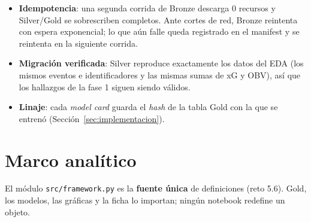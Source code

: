 \documentclass[11pt,a4paper]{article}
\begin{document}
\begin{itemize}
  \item \textbf{Idempotencia}: una segunda corrida de Bronze descarga 0 recursos y Silver/Gold se sobrescriben
        completos. Ante cortes de red, Bronze reintenta con espera exponencial; lo que aún falle queda registrado en el
        manifest y se reintenta en la siguiente corrida.
  \item \textbf{Migración verificada}: Silver reproduce exactamente los datos del EDA (los mismos \nEventos{} eventos e
        identificadores y las mismas sumas de xG y OBV), así que los hallazgos de la fase 1 siguen siendo válidos.
  \item \textbf{Linaje}: cada \emph{model card} guarda el \emph{hash} de la tabla Gold con la que se entrenó
        (Sección~\ref{sec:implementacion}).
\end{itemize}

\section{Marco analítico}\label{sec:marco}
El módulo \texttt{src/framework.py} es la \textbf{fuente única} de definiciones (reto 5.6). Gold, los modelos, las
gráficas y la ficha lo importan; ningún notebook redefine un objeto.
\end{document}
